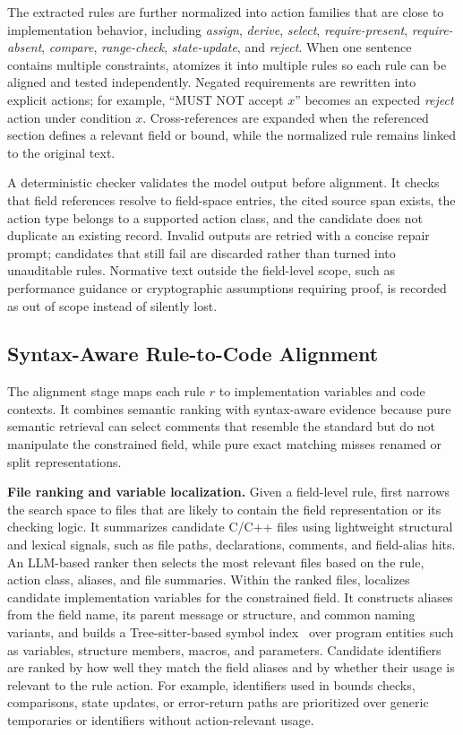 The extracted rules are further normalized into action families that are close
to implementation behavior, including \emph{assign}, \emph{derive},
\emph{select}, \emph{require-present}, \emph{require-absent},
\emph{compare}, \emph{range-check}, \emph{state-update}, and \emph{reject}.
When one sentence contains multiple constraints, \tool{} atomizes it into
multiple rules so each rule can be aligned and tested independently. Negated
requirements are rewritten into explicit actions; for example, ``MUST NOT
accept $x$'' becomes an expected \emph{reject} action under condition $x$.
Cross-references are expanded when the referenced section defines a relevant
field or bound, while the normalized rule remains linked to the original text.

A deterministic checker validates the model output before alignment. It checks
that field references resolve to field-space entries, the cited source span
exists, the action type belongs to a supported action class, and the candidate
does not duplicate an existing record. Invalid outputs are retried with a
concise repair prompt; candidates that still fail are discarded rather than
turned into unauditable rules. Normative text outside the field-level scope,
such as performance guidance or cryptographic assumptions requiring proof, is
recorded as out of scope instead of silently lost.

\noindent \subsection{Syntax-Aware Rule-to-Code Alignment}
\label{sec:alignment}

The alignment stage maps each rule $r$ to implementation variables and code
contexts. It combines semantic ranking with syntax-aware evidence because pure
semantic retrieval can select comments that resemble the standard but do not
manipulate the constrained field, while pure exact matching misses renamed or
split representations.

\noindent \textbf{File ranking and variable localization.}
Given a field-level rule, \tool{} first narrows the search space to files that
are likely to contain the field representation or its checking logic. It
summarizes candidate C/C++ files using lightweight structural and lexical
signals, such as file paths, declarations, comments, and field-alias hits. An
LLM-based ranker then selects the most relevant files based on the rule,
action class, aliases, and file summaries. Within the ranked files, \tool{}
localizes candidate implementation variables for the constrained field. It
constructs aliases from the field name, its parent message or structure, and
common naming variants, and builds a Tree-sitter-based symbol
index~\cite{tree_sitter} over program entities such as variables, structure
members, macros, and parameters. Candidate identifiers are ranked by how well
they match the field aliases and by whether their usage is relevant to the
rule action. For example, identifiers used in bounds checks, comparisons,
state updates, or error-return paths are prioritized over generic temporaries
or identifiers without action-relevant usage.

